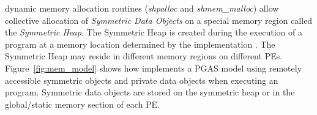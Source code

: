 \openshmem dynamic memory allocation routines (\textit{shpalloc} and
\textit{shmem\_malloc}) allow collective allocation of \emph{Symmetric Data
Objects} on a special memory region called the \emph{Symmetric Heap}. The
Symmetric Heap is created during the execution of a program at a memory location
determined by the implementation . The Symmetric 
Heap may reside in different memory regions on different \acp{PE}. 
Figure~\ref{fig:mem_model} shows  how \openshmem implements a \ac{PGAS} model 
using remotely accessible symmetric objects and private data objects when executing 
an \openshmem program. Symmetric data objects are stored on the symmetric heap or 
in the global/static memory section of each \ac{PE}. 
